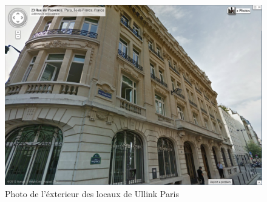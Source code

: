 \documentclass[a4paper, 12pt]{article}
\begin{document}
\begin{figure}
\includegraphics[width=\textwidth]{ullink_photo.png}
\caption{Photo de l'éxterieur des locaux de Ullink Paris}
\label{ullink_photo}
\end{figure}

\pagebreak


\end{document}
